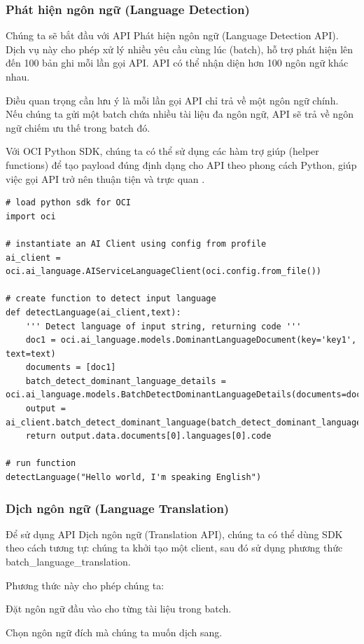 \subsubsection{Phát hiện ngôn ngữ (Language Detection)}
Chúng ta sẽ bắt đầu với API Phát hiện ngôn ngữ (Language Detection API). Dịch vụ này cho phép xử lý nhiều yêu cầu cùng lúc (batch), hỗ trợ phát hiện lên đến 100 bản ghi mỗi lần gọi API. API có thể nhận diện hơn 100 ngôn ngữ khác nhau.

Điều quan trọng cần lưu ý là mỗi lần gọi API chỉ trả về một ngôn ngữ chính. Nếu chúng ta gửi một batch chứa nhiều tài liệu đa ngôn ngữ, API sẽ trả về ngôn ngữ chiếm ưu thế trong batch đó.

Với OCI Python SDK, chúng ta có thể sử dụng các hàm trợ giúp (helper functions) để tạo payload đúng định dạng cho API theo phong cách Python, giúp việc gọi API trở nên thuận tiện và trực quan \cite{medium_exploring_oci_language_service}.

\begin{lstlisting}
# load python sdk for OCI
import oci

# instantiate an AI Client using config from profile
ai_client = oci.ai_language.AIServiceLanguageClient(oci.config.from_file())

# create function to detect input language
def detectLanguage(ai_client,text):
    ''' Detect language of input string, returning code '''
    doc1 = oci.ai_language.models.DominantLanguageDocument(key='key1', text=text)
    documents = [doc1]
    batch_detect_dominant_language_details = oci.ai_language.models.BatchDetectDominantLanguageDetails(documents=documents)
    output = ai_client.batch_detect_dominant_language(batch_detect_dominant_language_details)
    return output.data.documents[0].languages[0].code

# run function
detectLanguage("Hello world, I'm speaking English")

\end{lstlisting}

\subsubsection{Dịch ngôn ngữ (Language Translation)}
Để sử dụng API Dịch ngôn ngữ (Translation API), chúng ta có thể dùng SDK theo cách tương tự: chúng ta khởi tạo một client, sau đó sử dụng phương thức batch\_language\_translation.

Phương thức này cho phép chúng ta:
\begin{myitem}
    \item Đặt ngôn ngữ đầu vào cho từng tài liệu trong batch.

    \item Chọn ngôn ngữ đích mà chúng ta muốn dịch sang.

\end{myitem}

